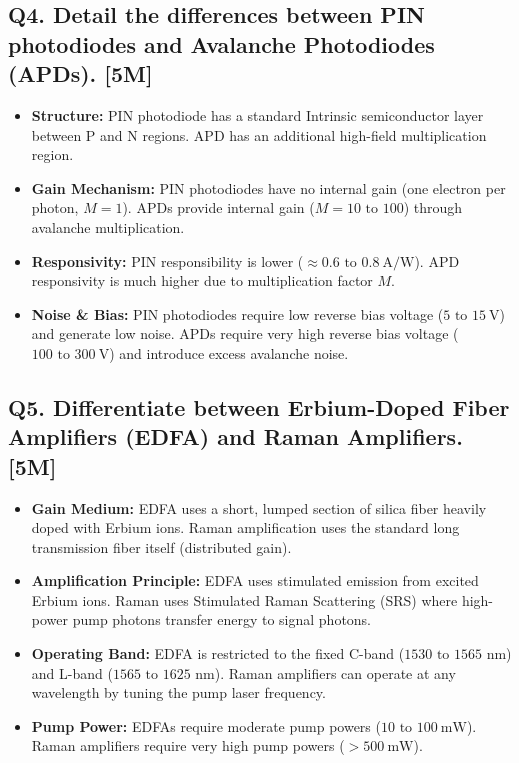 \subsection{Q4. Detail the differences between PIN photodiodes and Avalanche Photodiodes (APDs). [5M]}
\begin{itemize}
  \item   \textbf{Structure:} PIN photodiode has a standard Intrinsic semiconductor layer between P and N regions. APD has an additional high-field multiplication region.
  \item   \textbf{Gain Mechanism:} PIN photodiodes have no internal gain (one electron per photon, $M=1$). APDs provide internal gain ($M = 10 \text{ to } 100$) through avalanche multiplication.
  \item   \textbf{Responsivity:} PIN responsibility is lower ($\approx 0.6 \text{ to } 0.8\ \text{A/W}$). APD responsivity is much higher due to multiplication factor $M$.
  \item   \textbf{Noise \& Bias:} PIN photodiodes require low reverse bias voltage ($5 \text{ to } 15\ \text{V}$) and generate low noise. APDs require very high reverse bias voltage ($100 \text{ to } 300\ \text{V}$) and introduce excess avalanche noise.
\end{itemize}

\subsection{Q5. Differentiate between Erbium-Doped Fiber Amplifiers (EDFA) and Raman Amplifiers. [5M]}
\begin{itemize}
  \item   \textbf{Gain Medium:} EDFA uses a short, lumped section of silica fiber heavily doped with Erbium ions. Raman amplification uses the standard long transmission fiber itself (distributed gain).
  \item   \textbf{Amplification Principle:} EDFA uses stimulated emission from excited Erbium ions. Raman uses Stimulated Raman Scattering (SRS) where high-power pump photons transfer energy to signal photons.
  \item   \textbf{Operating Band:} EDFA is restricted to the fixed C-band ($1530 \text{ to } 1565\text{ nm}$) and L-band ($1565 \text{ to } 1625\text{ nm}$). Raman amplifiers can operate at any wavelength by tuning the pump laser frequency.
  \item   \textbf{Pump Power:} EDFAs require moderate pump powers ($10 \text{ to } 100\ \text{mW}$). Raman amplifiers require very high pump powers ($> 500\ \text{mW}$).
\end{itemize}

